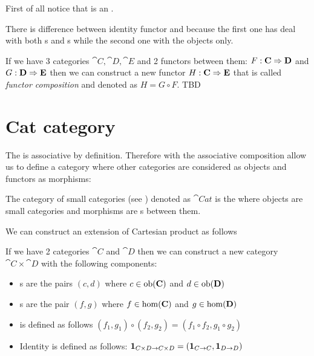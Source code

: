 \begin{remark}
  \label{rem:idfunctor}
  First of all notice that  is an
  .

  There is difference between identity functor and 
  because the first one has deal with both s and
  s while the second one with the objects
  only. 
\end{remark}

\begin{definition}
  \label{def:functor_composition}
  If we have 3 categories $\cat{C}, \cat{D}, \cat{E}$ and 2 functors
  between them: $F: \mathbf{C} \Rightarrow \mathbf{D}$ and $G: \mathbf{D} \Rightarrow \mathbf{E}$
  then we can construct a new functor $H: \mathbf{C} \Rightarrow \mathbf{E}$ that is
  called \textit{functor composition} and denoted as $H = G \circ F$.
  TBD
\end{definition}

\section{\textbf{Cat} category}
The  is associative by definition.
Therefore  with the associative composition
allow us to define a category where other categories are considered as
objects and functors as morphisms: 
\begin{definition}
  \label{def:catcategory}
  The category of small categories (see )
  denoted as $\cat{Cat}$ is the  where objects
  are small categories and morphisms are s
  between them.
\end{definition}

We can construct an extension of Cartesian product as follows
\begin{definition}
  \label{def:category_product}
  If we have 2 categories $\cat{C}$ and $\cat{D}$ then we can construct
  a new category $\cat{C} \times \cat{D}$ with the following components:
  \begin{itemize}
  \item {}s are the pairs $(c,d)$ where $c \in
    \mathrm{ob}(\mathbf{C})$ and $d \in \mathrm{ob}(\mathbf{D})$
  \item {}s are the pair $(f,g)$ where $f \in
    \mathrm{hom}(\mathbf{C})$ and $g \in \mathrm{hom}(\mathbf{D})$
  \item {} is defined as follows 
    \(
    (f_1, g_1) \circ (f_2, g_2) = (f_1 \circ f_2, g_1 \circ g_2)
    \)
  \item Identity is defined as follows: $\mathbf{1}_{ C \times D \to C \times D } = 
    \left(\mathbf{1}_{ C \to C }, \mathbf{1}_{ D \to D }\right)$
  \end{itemize}
\end{definition}

